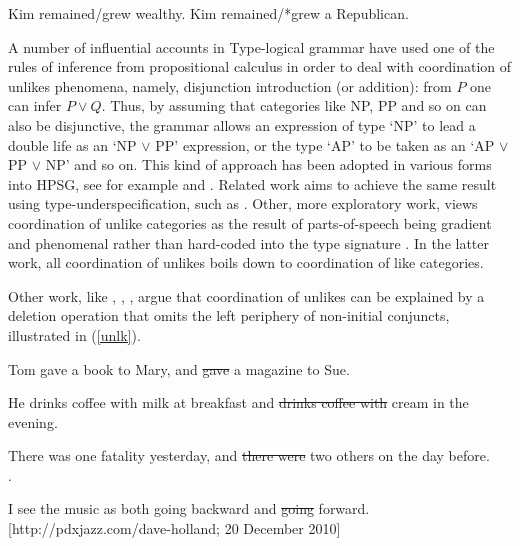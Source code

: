 \documentclass[output=paper]{langsci/langscibook}
\begin{document}
\begin{exe}
\ex
\begin{xlista}
\ex  Kim remained/grew wealthy.
\ex  Kim remained/*grew a Republican.
\end{xlista}\label{republican}
\end{exe}



\begin{exe}
\ex
\begin{xlista}
\end{xlista}\label{show2}
\end{exe}



A number of influential accounts in Type-logical grammar
\citep{morrill90,morrill94,bayer} have used one of the rules of
inference from propositional calculus in order to deal with
coordination of unlikes phenomena, namely, disjunction introduction
(or addition): from $P$ one can infer $P \vee Q$. 
Thus, by assuming that categories like NP, PP
and so on can also be disjunctive, the grammar allows an expression
of type `NP' to lead a double life as an `NP $\vee$ PP' expression,
or the type `AP' to be taken as an `AP $\vee$ PP $\vee$ NP' and so
on. This kind of approach has been adopted in various forms into HPSG, see for example \citet{Daniels02} and  \citet{Yatabe:04}.
Related work aims to achieve the same result using type-underspecification, such as 
 \citet{sag}. Other, more exploratory work, views coordination of unlike categories as the result of   parts-of-speech being gradient and  phenomenal rather than hard-coded into the type signature  \citep{bookivan}. In the latter work, all coordination 
 of unlikes boils down to coordination of like categories.
 

Other work, like
 \citet{berthold0}, \citet{yatabe},  \citet{Beavers},
 \citet{chaves06}  argue that
coordination of unlikes can be explained by
a deletion operation that omits the left periphery of
non-initial conjuncts, illustrated in   (\ref{unlk}).


\begin{exe}
\ex
\begin{xlista}
\ex Tom gave a book to Mary, and \sout{gave} a magazine to Sue. 

\ex He drinks coffee with milk at breakfast and \sout{drinks coffee with} cream in the evening.\\ \citep{hudson84}

\ex There was one fatality yesterday, and \sout{there were} two others on the day
before.\\
\citep[339]{chavesthesis}.

\ex I see the music as both going backward and \sout{going} forward.\\
{\small [http://pdxjazz.com/dave-holland; 20 December 2010]}
\end{xlista}\label{unlk}
\end{exe}
\end{document}
